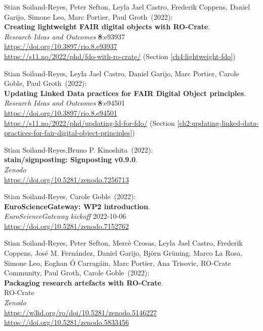 \begin{thebibliography}{9}
Stian Soiland-Reyes, Peter Sefton, Leyla Jael Castro, Frederik Coppens, Daniel Garijo, Simone Leo, Marc Portier, Paul Groth~(2022): \\
\textbf{Creating lightweight FAIR digital objects with RO-Crate}.\\
\emph{Research Ideas and Outcomes} \textbf{8}:e93937 \\
\url{https://doi.org/10.3897/rio.8.e93937} \\
\url{https://s11.no/2022/phd/fdo-with-ro-crate/}
(Section \vref{ch4:lightweight-fdo})

Stian Soiland-Reyes, Leyla Jael Castro, Daniel Garijo, Marc Portier, Carole Goble, Paul Groth~(2022): \\
\textbf{Updating Linked Data practices for FAIR Digital Object principles}. \\
\emph{Research Ideas and Outcomes} \textbf{8}:e94501 \\
\url{https://doi.org/10.3897/rio.8.e94501}\\
\url{https://s11.no/2022/phd/updating-ld-for-fdo/} (Section \vref{ch2:updating-linked-data-practices-for-fair-digital-object-principles})

Stian Soiland-Reyes,Bruno P. Kinoshita~(2022): \\
\textbf{stain/signposting: Signposting v0.9.0}.\\
\emph{Zenodo}\\
\url{https://doi.org/10.5281/zenodo.7256713}

Stian Soiland-Reyes, Carole Goble~(2022): \\
\textbf{EuroScienceGateway: WP2 introduction}.\\
\emph{EuroScienceGateway kickoff} 2022-10-06\\
\url{https://doi.org/10.5281/zenodo.7152762}

Stian Soiland-Reyes, Peter Sefton, Mercè Crosas, Leyla Jael Castro, Frederik Coppens, José M. Fernández, Daniel Garijo, Björn Grüning, Marco La Rosa, Simone Leo, Eoghan Ó Carragáin, Marc Portier, Ana Trisovic, RO-Crate Community, Paul Groth, Carole Goble~(2022): \\
\textbf{Packaging research artefacts with RO-Crate}. \\
RO-Crate\\
\emph{Zenodo}\\
\url{https://w3id.org/ro/doi/10.5281/zenodo.5146227} \\
\url{https://doi.org/10.5281/zenodo.5833456}


\end{thebibliography}
